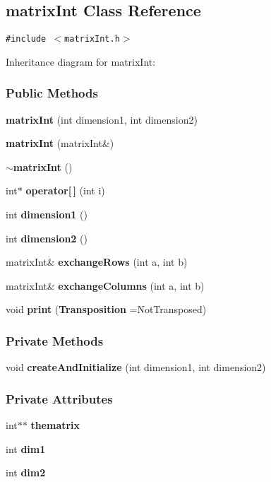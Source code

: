 \subsection{matrix\-Int  Class Reference}
\label{matrixInt}
{\tt \#include $<$matrix\-Int.h$>$}

Inheritance diagram for matrix\-Int:\begin{figure}[H]
\begin{center}
\leavevmode
\setlength{\epsfysize}{2cm}
\end{center}
\end{figure}
\subsubsection*{Public Methods}
\begin{CompactItemize}
\item 
{\bf matrix\-Int} (int dimension1, int dimension2)
\item 
{\bf matrix\-Int} (matrix\-Int\&)
\item 
{\bf $\sim$matrix\-Int} ()
\item 
int$\ast$ {\bf operator[$\,$]} (int i)
\item 
int {\bf dimension1} ()
\item 
int {\bf dimension2} ()
\item 
matrix\-Int\& {\bf exchange\-Rows} (int a, int b)
\item 
matrix\-Int\& {\bf exchange\-Columns} (int a, int b)
\item 
void {\bf print} ({\bf Transposition} =Not\-Transposed)
\end{CompactItemize}
\subsubsection*{Private Methods}
\begin{CompactItemize}
\item 
void {\bf create\-And\-Initialize} (int dimension1, int dimension2)
\end{CompactItemize}
\subsubsection*{Private Attributes}
\begin{CompactItemize}
\item 
int$\ast$$\ast$ {\bf thematrix}
\item 
int {\bf dim1}
\item 
int {\bf dim2}
\end{CompactItemize}



